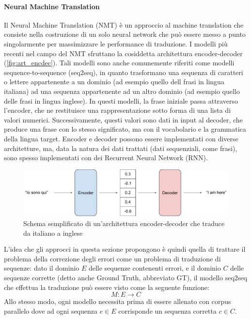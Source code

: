 \paragraph{Neural Machine Translation} Il Neural Machine Translation (NMT) è un approccio al machine translation che consiste nella costruzione di un solo neural network che può essere messo a punto singolarmente per massimizzare le performance di traduzione\cite{nmtdef}. I modelli più recenti nel campo del NMT sfruttano la cosiddetta architettura encoder-decoder (\autoref{fig:art_encdec}). Tali modelli sono anche comunemente riferiti come modelli sequence-to-sequence (seq2seq), in quanto trasformano una sequenza di caratteri o lettere appartenente a un dominio (ad esempio quello dell frasi in lingua italiana) ad una sequenza appartenente ad un altro dominio (ad esempio quello delle frasi in lingua inglese). In questi modelli, la frase iniziale passa attraverso l'encoder, che ne restituisce una rappresentazione sotto forma di una lista di valori numerici. Successivamente, questi valori sono dati in input al decoder, che produce una frase con lo stesso significato, ma con il vocabolario e la grammatica della lingua target. Encoder e decoder possono essere implementati con diverse architetture, ma, data la natura dei dati trattati (dati sequenziali, come frasi), sono spesso implementati con dei Recurrent Neural Network (RNN).


\begin{figure}[H]
\centering
\includegraphics[width=\textwidth]{immagini/stato_arte/encoder_decoder}
\caption{Schema semplificato di un'architettura encoder-decoder che traduce da italiano a inglese}
\label{fig:art_encdec}
\end{figure}

L'idea che gli approcci in questa sezione propongono è quindi quella di trattare il problema della correzione degli errori come un problema di traduzione di sequenze: dato il dominio $E$ delle sequenze contenenti errori, e il dominio $C$ delle sequenze corrette (detto anche Ground Truth, abbreviato GT), il modello seq2seq che effettua la traduzione può essere visto come la seguente funzione:
\begin{equation}
M: E \rightarrow C
\end{equation}
Allo stesso modo, ogni modello necessita prima di essere allenato con corpus parallelo dove ad ogni sequenza $e \in E$ corrisponde un sequenza corretta $c \in C$.

